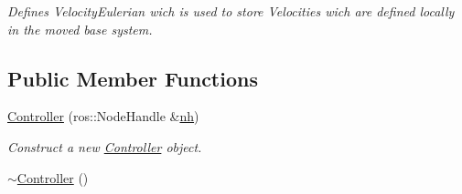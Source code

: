 \begin{DoxyCompactItemize}
\begin{DoxyCompactList}\small\item\em Defines Velocity\+Eulerian wich is used to store Velocities wich are defined locally in the moved base system. \end{DoxyCompactList}\end{DoxyCompactItemize}
\subsection*{Public Member Functions}
\begin{DoxyCompactItemize}
\item 
\hyperlink{classController_a7341f9092e1977cdd2a1492c4422c019}{Controller} (ros\+::\+Node\+Handle \&\hyperlink{classController_a24e3d3c2536f6ed29018bad1fd53dae2}{nh})
\begin{DoxyCompactList}\small\item\em Construct a new \hyperlink{classController}{Controller} object. \end{DoxyCompactList}\item 
\hyperlink{classController_a0ab87934c4f7a266cfdb86e0f36bc1b5}{$\sim$\+Controller} ()\hypertarget{classController_a0ab87934c4f7a266cfdb86e0f36bc1b5}{}\label{classController_a0ab87934c4f7a266cfdb86e0f36bc1b5}


\end{DoxyCompactItemize}
